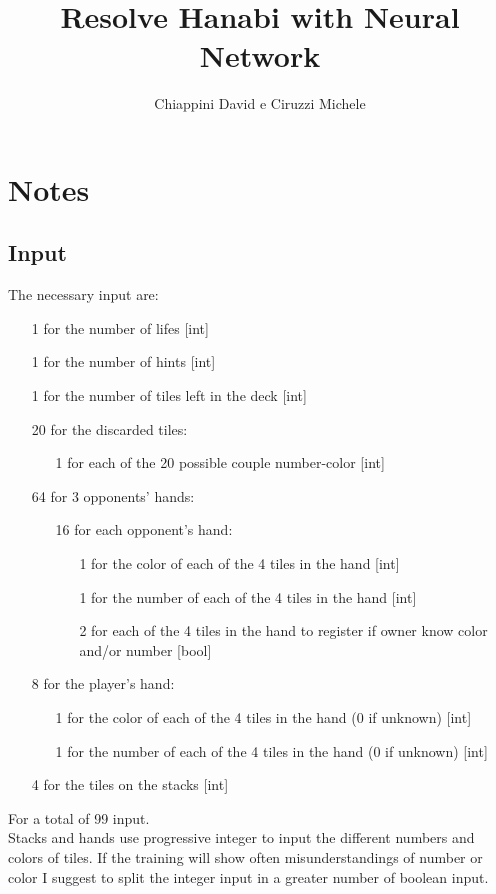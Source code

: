 \documentclass[]{article}
\title{Resolve Hanabi with Neural Network}
\author{Chiappini David e Ciruzzi Michele}
\begin{document}
\maketitle

\section{Notes}

\subsection{Input}
The necessary input are:
\begin{itemize}
	\item[1] for the number of lifes [int]
	\item[1] for the number of hints [int]
	\item[1] for the number of tiles left in the deck [int] 
	\item[20] for the discarded tiles:
	\begin{itemize}
		\item[1] for each of the 20 possible couple number-color [int]
	\end{itemize}
	\item[64] for 3 opponents' hands:
	\begin{itemize}
		\item[16] for each opponent's hand:
		\begin{itemize}
			\item[1] for the color of each of the 4 tiles in the hand [int]
			\item[1] for the number of each of the 4 tiles in the hand [int]
			\item[2] for each of the 4 tiles in the hand to register if owner know color and/or number [bool]
		\end{itemize}
	\end{itemize}
	\item[8] for the player's hand:
	\begin{itemize}
		\item[1] for the color of each of the 4 tiles in the hand (0 if unknown) [int]
		\item[1] for the number of each of the 4 tiles in the hand (0 if unknown) [int]
	\end{itemize}
	\item[4] for the tiles on the stacks [int]
\end{itemize}
For a total of 99 input. \\
Stacks and hands use progressive integer to input the different numbers and colors of tiles. If the training will show often misunderstandings of number or color I suggest to split the integer input in a greater number of boolean input.
\end{document}
